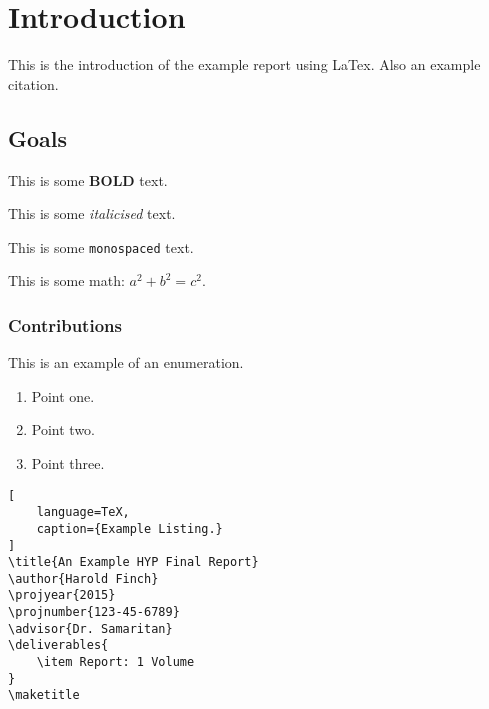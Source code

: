 \chapter{Introduction}
This is the introduction of the example report using LaTex\cite{lamport1986document}.
Also an example citation.

\section{Goals}
This is some \textbf{BOLD} text.

This is some \textit{italicised} text.

This is some \texttt{monospaced} text.

This is some math: $a^2 + b^2 = c^2$.

\subsection{Contributions}
This is an example of an enumeration.

\begin{enumerate}
    \item Point one.
    \item Point two.
    \item Point three.
\end{enumerate}

\begin{lstlisting}[
    language=TeX,
    caption={Example Listing.}
]
\title{An Example HYP Final Report}
\author{Harold Finch}
\projyear{2015}
\projnumber{123-45-6789}
\advisor{Dr. Samaritan}
\deliverables{
    \item Report: 1 Volume
}
\maketitle
\end{lstlisting}